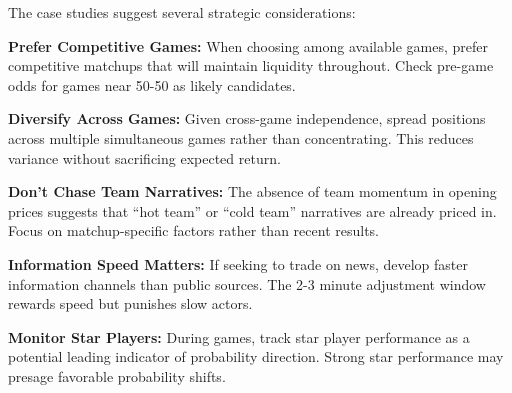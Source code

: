 The case studies suggest several strategic considerations:

\textbf{Prefer Competitive Games:} When choosing among available games, prefer competitive matchups that will maintain liquidity throughout. Check pre-game odds for games near 50-50 as likely candidates.

\textbf{Diversify Across Games:} Given cross-game independence, spread positions across multiple simultaneous games rather than concentrating. This reduces variance without sacrificing expected return.

\textbf{Don't Chase Team Narratives:} The absence of team momentum in opening prices suggests that ``hot team'' or ``cold team'' narratives are already priced in. Focus on matchup-specific factors rather than recent results.

\textbf{Information Speed Matters:} If seeking to trade on news, develop faster information channels than public sources. The 2-3 minute adjustment window rewards speed but punishes slow actors.

\textbf{Monitor Star Players:} During games, track star player performance as a potential leading indicator of probability direction. Strong star performance may presage favorable probability shifts.
